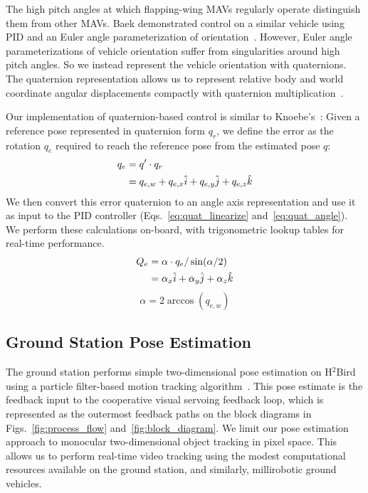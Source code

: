 \documentclass{aamas2013}
\begin{document}
The high pitch angles at which flapping-wing MAVs regularly operate 
distinguish them from other MAVs. Baek demonstrated control on a similar 
vehicle using PID and an Euler angle parameterization of orientation~\cite{baek:tracking}. 
However, Euler angle parameterizations of vehicle orientation suffer from 
singularities around high pitch angles. So we instead represent the vehicle 
orientation with quaternions. The quaternion representation allows us to 
represent relative body and world coordinate angular displacements compactly 
with quaternion multiplication~\cite{hamilton1866elements}.

Our implementation of quaternion-based control is similar to 
Knoebe's~\cite{knoebe:quatcontrol}:
Given a reference pose represented in quaternion form $q_r$, we define the 
error as the rotation $q_e$ required to reach the reference pose from the 
estimated pose $q$:
\begin{align}
\label{eq:quat_error}
q_e &= q^{\prime}\cdot q_r \\
		&= q_{e,w} + q_{e,x}\hat{i} + q_{e,y}\hat{j} + q_{e,z}\hat{k} \notag 
\end{align}
We then convert this error quaternion to an angle axis representation and 
use it as input to the PID controller (Eqs.~\ref{eq:quat_linearize} and~\ref{eq:quat_angle}).
We perform these calculations on-board, with trigonometric lookup tables for 
real-time performance.
\begin{align}
\label{eq:quat_linearize}
Q_e &= \alpha\cdot q_e/\sin(\alpha /2) \\
		&= \alpha_{x}\hat{i} + \alpha_{y}\hat{j} + \alpha_{z}\hat{k} \notag
\end{align}
\begin{equation}
\label{eq:quat_angle}
\alpha = 2\arccos(q_{e,w})
\end{equation}

\subsection{Ground Station Pose Estimation}
The ground station performs simple two-dimensional pose estimation on 
H$^2$Bird using a particle filter-based motion tracking algorithm~\cite{thrun2005probabilistic}. This pose 
estimate is the feedback input to the cooperative visual servoing feedback 
loop, which is represented as the outermost feedback paths on the block 
diagrams in Figs.~\ref{fig:process_flow} and~\ref{fig:block_diagram}. We 
limit our pose estimation approach to monocular two-dimensional object 
tracking in pixel space. This allows us to perform real-time video tracking 
using the modest computational resources available on the ground station, 
and similarly, millirobotic ground vehicles.
\end{document}
